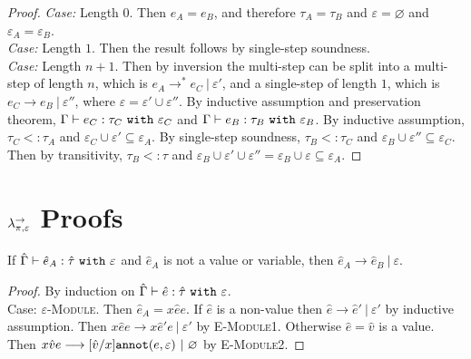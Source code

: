 \begin{appendix}
\begin{proof}
\textit{Case:} Length $0$. Then $e_A = e_B$, and therefore $\tau_A = \tau_B$ and $\varepsilon = \varnothing$ and $\varepsilon_A = \varepsilon_B$.\\

\textit{Case:} Length $1$. Then the result follows by single-step soundness.\\

\textit{Case:} Length $n+1$. Then by inversion the multi-step can be split into a multi-step of length $n$, which is $ e_A \longrightarrow^{*}  e_C~|~\varepsilon'$, and a single-step of length $1$, which is $e_C \longrightarrow e_B~|~\varepsilon''$, where $\varepsilon = \varepsilon' \cup \varepsilon''$. By inductive assumption and preservation theorem, $ \Gamma \vdash  e_C:  \tau_C~\mathtt{with}~ \varepsilon_C$ and $ \Gamma \vdash  e_B:  \tau_B~\mathtt{with}~ \varepsilon_B$. By inductive assumption, $ \tau_C <:  \tau_A$ and $ \varepsilon_C \cup \varepsilon' \subseteq \varepsilon_A$. By single-step soundness, $ \tau_B <:  \tau_C$ and $ \varepsilon_B \cup \varepsilon'' \subseteq \varepsilon_C$. Then by transitivity, $ \tau_B <:  \tau$ and $ \varepsilon_B \cup \varepsilon' \cup \varepsilon'' = \varepsilon_B \cup \varepsilon \subseteq \varepsilon_A$.
\end{proof}















\chapter{$\lambda^{\rightarrow}_{\pi, \varepsilon}$ Proofs}\label{appendix:LAS File}

\begin{theorem}[Progress]
If $\hat \Gamma \vdash \hat e_A: \hat \tau~\mathtt{with}~ \varepsilon$ and $\hat e_A$ is not a value or variable, then $\hat e_A \longrightarrow \hat e_B~|~\varepsilon$.
\end{theorem}

\begin{proof} By induction on $\hat \Gamma \vdash \hat e: \hat \tau~\mathtt{with}~ \varepsilon$.\\

Case: \textsc{$\varepsilon$-Module}. Then $\hat e_A = {x}{\hat e}{e}$. If $\hat e$ is a non-value then $\hat e \longrightarrow \hat e'~|~\varepsilon'$ by inductive assumption. Then ${x}{\hat e}{e} \longrightarrow {x}{\hat e'}{e}~|~\varepsilon'$ by \textsc{E-Module1}. Otherwise $\hat e = \hat v$ is a value. Then ${x}{\hat v}{e} \longrightarrow [\hat v/x]\mathtt{annot}(e, \varepsilon)~|~\varnothing$ by \textsc{E-Module2}.
\end{proof}



\end{appendix}
